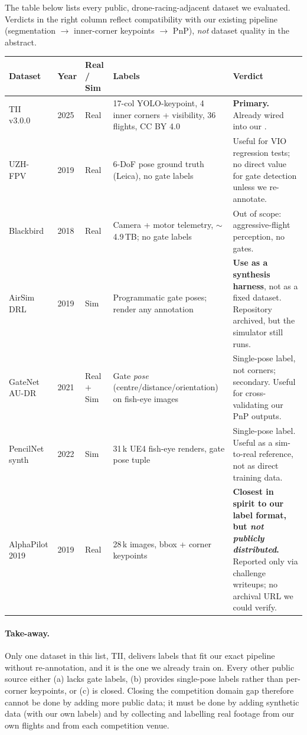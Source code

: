 \documentclass[11pt,a4paper]{article}
\DeclareRobustCommand{\code}[1]{\codeurl{#1}}
\begin{document}
The table below lists every public, drone-racing-adjacent dataset we evaluated. Verdicts in the right column reflect compatibility with our existing pipeline (segmentation $\rightarrow$ inner-corner keypoints $\rightarrow$ PnP), \emph{not} dataset quality in the abstract.

{\small
\begin{tabularx}{\linewidth}{@{} L{2.8cm} L{0.9cm} L{1.2cm} X L{3.6cm} @{}}
\toprule
\textbf{Dataset} & \textbf{Year} & \textbf{Real /\,Sim} & \textbf{Labels} & \textbf{Verdict} \\
\midrule
TII v3.0.0~\cite{tii2025dataset} & 2025 & Real & 17-col YOLO-keypoint, 4 inner corners + visibility, 36 flights, CC BY 4.0 & \textbf{Primary.} Already wired into our \code{discovery.py}. \\
\addlinespace
UZH-FPV~\cite{delmerico2019uzhfpv} & 2019 & Real & 6-DoF pose ground truth (Leica), no gate labels & Useful for VIO regression tests; no direct value for gate detection unless we re-annotate. \\
\addlinespace
Blackbird~\cite{antonini2018blackbird} & 2018 & Real & Camera + motor telemetry, $\sim$4.9\,TB; no gate labels & Out of scope: aggressive-flight perception, no gates. \\
\addlinespace
AirSim DRL~\cite{microsoft2019airsim} & 2019 & Sim & Programmatic gate poses; render any annotation & \textbf{Use as a synthesis harness}, not as a fixed dataset. Repository archived, but the simulator still runs. \\
\addlinespace
GateNet AU-DR~\cite{pham2021gatenet} & 2021 & Real $+$ Sim & Gate \emph{pose} (centre/distance/orientation) on fish-eye images & Single-pose label, not corners; secondary. Useful for cross-validating our PnP outputs. \\
\addlinespace
PencilNet synth~\cite{pham2022pencilnet} & 2022 & Sim & 31\,k UE4 fish-eye renders, gate pose tuple & Single-pose label. Useful as a sim-to-real reference, not as direct training data. \\
\addlinespace
AlphaPilot 2019 & 2019 & Real & 28\,k images, bbox + corner keypoints & \textbf{Closest in spirit to our label format, but \emph{not publicly distributed}.} Reported only via challenge writeups; no archival URL we could verify. \\
\bottomrule
\end{tabularx}
}

\paragraph{Take-away.} Only one dataset in this list, TII, delivers labels that fit our exact pipeline without re-annotation, and it is the one we already train on. Every other public source either (a) lacks gate labels, (b) provides single-pose labels rather than per-corner keypoints, or (c) is closed. Closing the competition domain gap therefore cannot be done by adding more public data; it must be done by adding synthetic data (with our own labels) and by collecting and labelling real footage from our own flights and from each competition venue.
\end{document}
